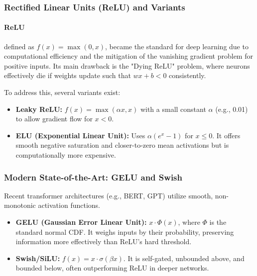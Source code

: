 \subsubsection{Rectified Linear Units (ReLU) and Variants}

\paragraph{ReLU} defined as $f(x) = \max(0, x)$, became the standard for deep learning due to computational efficiency and the mitigation of the vanishing gradient problem for positive inputs. Its main drawback is the "Dying ReLU" problem, where neurons effectively die if weights update such that $wx+b < 0$ consistently.

To address this, several variants exist:
\begin{itemize}
    \item \textbf{Leaky ReLU:} $f(x) = \max(\alpha x, x)$ with a small constant $\alpha$ (e.g., 0.01) to allow gradient flow for $x < 0$.
    \item \textbf{ELU (Exponential Linear Unit):} Uses $\alpha(e^x - 1)$ for $x \le 0$. It offers smooth negative saturation and closer-to-zero mean activations but is computationally more expensive.
\end{itemize}

\subsubsection{Modern State-of-the-Art: GELU and Swish}

Recent transformer architectures (e.g., BERT, GPT) utilize smooth, non-monotonic activation functions.

\begin{itemize}
    \item \textbf{GELU (Gaussian Error Linear Unit):} $x \cdot \Phi(x)$, where $\Phi$ is the standard normal CDF. It weighs inputs by their probability, preserving information more effectively than ReLU's hard threshold.
    \item \textbf{Swish/SiLU:} $f(x) = x \cdot \sigma(\beta x)$. It is self-gated, unbounded above, and bounded below, often outperforming ReLU in deeper networks.
\end{itemize}

